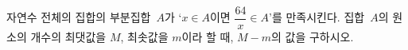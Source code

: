자연수 전체의 집합의 부분집합~$A$가 `$x\in A$이면 $\dfrac{64}{x}\in A$'를 만족시킨다. 집합~$A$의 원소의 개수의 최댓값을 $M$, 최솟값을 $m$이라 할 때, $M-m$의 값을 구하시오. 
